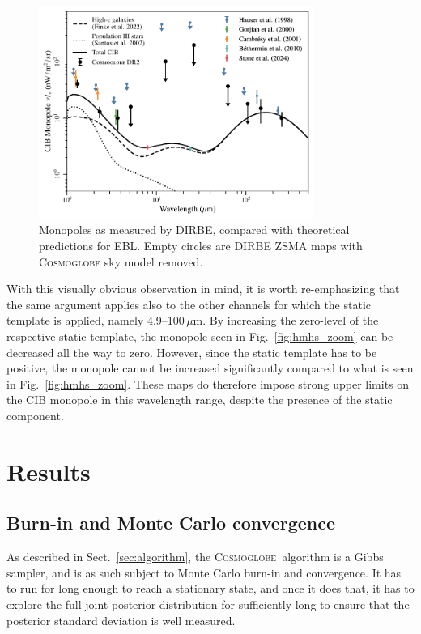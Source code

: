 \documentclass{aa}
\newcommand{\cosmoglobe}{\textsc{Cosmoglobe}}
\begin{document}
\begin{figure}
	\centering
	\includegraphics[width=0.8\textwidth]{figs/CIB_mono.pdf}
	\caption{Monopoles as measured by DIRBE, compared with theoretical predictions for EBL. Empty circles are DIRBE ZSMA maps with \textsc{Cosmoglobe} sky model removed.}
	\label{fig: EBL_monopoles}
\end{figure}


With this visually obvious observation in mind, it is worth
re-emphasizing that the same argument applies also to the other
channels for which the static template is applied, namely
4.9--100$\,\mu\mathrm{m}$. By increasing the zero-level of the
respective static template, the monopole seen in
Fig.~\ref{fig:hmhs_zoom} can be decreased all the way to
zero. However, since the static template has to be positive, the monopole
cannot be increased significantly compared to what is seen in
Fig.~\ref{fig:hmhs_zoom}. These maps do therefore impose strong upper
limits on the CIB monopole in this wavelength range, despite the
presence of the static component.


\section{Results}
\label{sec:results}

\subsection{Burn-in and Monte Carlo convergence}

As described in Sect.~\ref{sec:algorithm}, the \cosmoglobe\ algorithm is a
Gibbs sampler, and is as such subject to Monte Carlo burn-in and
convergence. It has to run for long enough to reach a stationary
state, and once it does that, it has to explore the full joint
posterior distribution for sufficiently long to ensure that the
posterior standard deviation is well measured.
\end{document}
